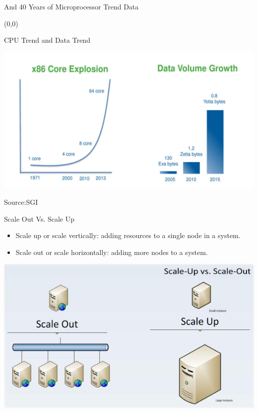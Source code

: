 \documentclass[english]{beamer} %
\begin{document}
\begin{frame}{And 40 Years of Microprocessor Trend Data}
\begin{textblock}{1}(0,0)
\end{textblock}
\end{frame}

\begin{frame}{CPU Trend and Data Trend}
\begin{center}
\includegraphics[scale=0.4]{fig/cpudata}
\end{center}
Source:SGI
\end{frame}

\begin{frame}{Scale Out Vs. Scale Up}
    \begin{itemize}
    \item Scale up or scale vertically: adding resources to a single node in a
    system.
    \item Scale out or scale horizontally: adding more nodes to a system.
    \end{itemize}
\begin{center}
\includegraphics[scale=0.5]{fig/scale}
\end{center}
\end{frame}
\end{document}

